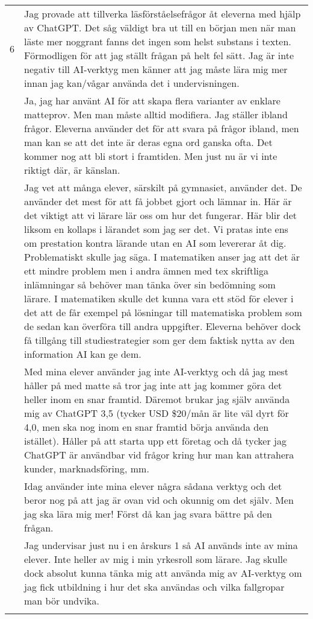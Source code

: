 \begin{table}[h]
{\begin{tabularx}{\textwidth}{@{}lX@{}}
6 & Jag provade att tillverka läsförståelsefrågor åt eleverna med hjälp av ChatGPT. Det såg väldigt bra ut till en början men när man läste mer noggrant fanns det ingen som helst substans i texten. Förmodligen för att jag ställt frågan på helt fel sätt. Jag är inte negativ till AI-verktyg men känner att jag måste lära mig mer innan jag kan/vågar använda det i undervisningen. \\ \hdashline
7 & Ja, jag har använt AI för att skapa flera varianter av enklare matteprov. Men man måste alltid modifiera. Jag ställer ibland frågor. Eleverna använder det för att svara på frågor ibland, men man kan se att det inte är deras egna ord ganska ofta. Det kommer nog att bli stort i framtiden. Men just nu är vi inte riktigt där, är känslan. \\ \hdashline
8 & Jag vet att många elever, särskilt på gymnasiet, använder det. De använder det mest för att få jobbet gjort och lämnar in. Här är det viktigt att vi lärare lär oss om hur det fungerar. Här blir det liksom en kollaps i lärandet som jag ser det. Vi pratas inte ens om prestation kontra lärande utan en AI som levererar åt dig. Problematiskt skulle jag säga. I matematiken anser jag att det är ett mindre problem men i andra ämnen med tex skriftliga inlämningar så behöver man tänka över sin bedömning som lärare. I matematiken skulle det kunna vara ett stöd för elever i det att de får exempel på lösningar till matematiska problem som de sedan kan överföra till andra uppgifter. Eleverna behöver dock få tillgång till studiestrategier som ger dem faktisk nytta av den information AI kan ge dem. \\ \hdashline
9 & Med mina elever använder jag inte AI-verktyg och då jag mest håller på med matte så tror jag inte att jag kommer göra det heller inom en snar framtid. Däremot brukar jag själv använda mig av ChatGPT 3,5 (tycker USD \$20/mån är lite väl dyrt för 4,0, men ska nog inom en snar framtid börja använda den istället). Håller på att starta upp ett företag och då tycker jag ChatGPT är användbar vid frågor kring hur man kan attrahera kunder, marknadsföring, mm. \\ \hdashline
10 & Idag använder inte mina elever några sådana verktyg och det beror nog på att jag är ovan vid och okunnig om det själv. Men jag ska lära mig mer! Först då kan jag svara bättre på den frågan. \\ \hdashline
11 & Jag undervisar just nu i en årskurs 1 så AI används inte av mina elever. Inte heller av mig i min yrkesroll som lärare. Jag skulle dock absolut kunna tänka mig att använda mig av AI-verktyg om jag fick utbildning i hur det ska användas och vilka fallgropar man bör undvika. \\ \hdashline

\end{tabularx}}
\end{table}

